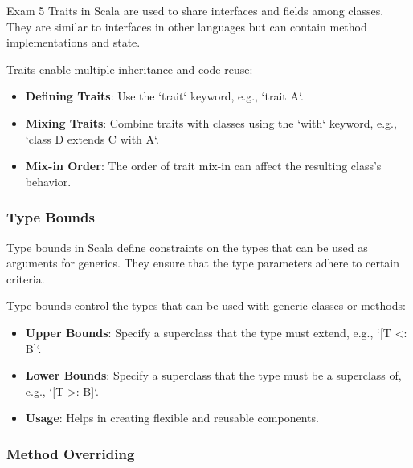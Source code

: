 \begin{examnotes}{Exam 5}
    Traits in Scala are used to share interfaces and fields among classes. They are similar to interfaces in other languages but can contain method implementations and state.
    
    \begin{highlight}
        Traits enable multiple inheritance and code reuse:
        \begin{itemize}
            \item \textbf{Defining Traits}: Use the `trait` keyword, e.g., `trait A`.
            \item \textbf{Mixing Traits}: Combine traits with classes using the `with` keyword, e.g., `class D extends C with A`.
            \item \textbf{Mix-in Order}: The order of trait mix-in can affect the resulting class's behavior.
        \end{itemize}
    \end{highlight}
    
    \subsubsection*{Type Bounds}
    
    Type bounds in Scala define constraints on the types that can be used as arguments for generics. They ensure that the type parameters adhere to certain criteria.
    
    \begin{highlight}
        Type bounds control the types that can be used with generic classes or methods:
        \begin{itemize}
            \item \textbf{Upper Bounds}: Specify a superclass that the type must extend, e.g., `[T <: B]`.
            \item \textbf{Lower Bounds}: Specify a superclass that the type must be a superclass of, e.g., `[T >: B]`.
            \item \textbf{Usage}: Helps in creating flexible and reusable components.
        \end{itemize}
    \end{highlight}
    
    \subsubsection*{Method Overriding}
    

\end{examnotes}

